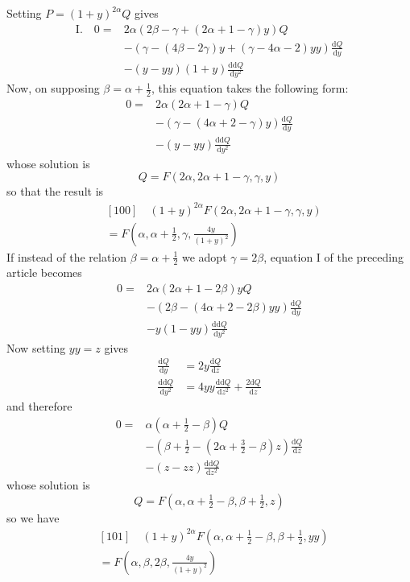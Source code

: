 Setting $P=(1+y)^{2\alpha}Q$ gives
\[
\begin{aligned}
\mathrm I.\quad 0={}&2\alpha(2\beta-\gamma+(2\alpha+1-\gamma)y)Q\\
&-(\gamma-(4\beta-2\gamma)y+(\gamma-4\alpha-2)yy)\frac{\mathrm dQ}{\mathrm dy}\\
&-(y-yy)(1+y)\frac{\mathrm{dd}Q}{\mathrm dy^2}
\end{aligned}
\]
Now, on supposing $\beta=\alpha+\frac12$, this equation takes the following form:
\[
\begin{aligned}
0={}&2\alpha(2\alpha+1-\gamma)Q\\
&-(\gamma-(4\alpha+2-\gamma)y)\frac{\mathrm dQ}{\mathrm dy}\\
&-(y-yy)\frac{\mathrm{dd}Q}{\mathrm dy^2}
\end{aligned}
\]
whose solution is
\[
Q=F(2\alpha,2\alpha+1-\gamma,\gamma,y)
\]
so that the result is
\[
\begin{aligned}&[100]\quad(1+y)^{2\alpha}F(2\alpha,2\alpha+1-\gamma,\gamma,y)\\&=F(\alpha,\alpha+\tfrac12,\gamma,\tfrac{4y}{(1+y)^2})\end{aligned}
\]
If instead of the relation $\beta=\alpha+\frac12$ we adopt $\gamma=2\beta$, equation I of the preceding article becomes
\[
\begin{aligned}
0={}&2\alpha(2\alpha+1-2\beta)yQ\\
&-(2\beta-(4\alpha+2-2\beta)yy)\frac{\mathrm dQ}{\mathrm dy}\\
&-y(1-yy)\frac{\mathrm{dd}Q}{\mathrm dy^2}
\end{aligned}
\]
Now setting $yy=z$ gives
\[
\begin{aligned}
\frac{\mathrm dQ}{\mathrm dy}&=2y\frac{\mathrm dQ}{\mathrm dz}\\
\frac{\mathrm{dd}Q}{\mathrm dy^2}&=4yy\frac{\mathrm{dd}Q}{\mathrm dz^2}+\frac{2\mathrm dQ}{\mathrm dz}
\end{aligned}
\]
and therefore
\[
\begin{aligned}
0={}&\alpha(\alpha+\tfrac12-\beta)Q\\
&-(\beta+\tfrac12-(2\alpha+\tfrac32-\beta)z)\frac{\mathrm dQ}{\mathrm dz}\\
&-(z-zz)\frac{\mathrm{dd}Q}{\mathrm dz^2}
\end{aligned}
\]
whose solution is
\[
Q=F(\alpha,\alpha+\tfrac12-\beta,\beta+\tfrac12,z)
\]
so we have
\[
\begin{aligned}&[101]\quad(1+y)^{2\alpha}F(\alpha,\alpha+\tfrac12-\beta,\beta+\tfrac12,yy)\\&=F(\alpha,\beta,2\beta,\tfrac{4y}{(1+y)^2})\end{aligned}
\]
